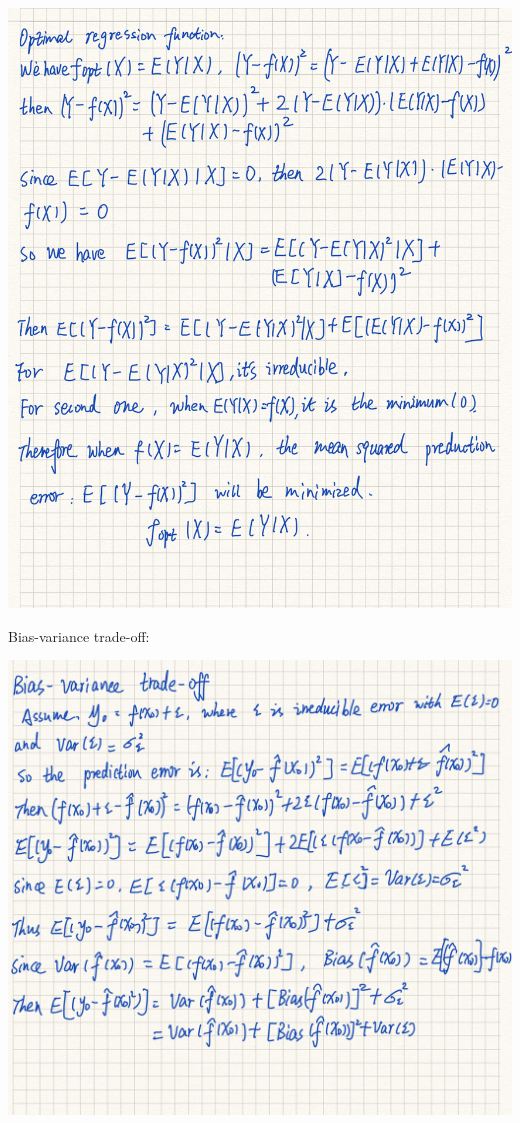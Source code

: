 \documentclass[
]{article}
\begin{document}
\includegraphics{images/clipboard-2780810541.jpeg}

Bias-variance trade-off:

\includegraphics{images/clipboard-2041856251.jpeg}
\end{document}
